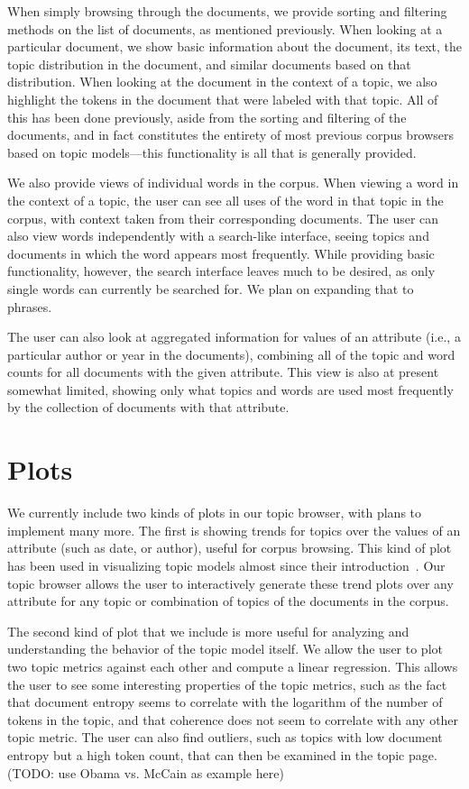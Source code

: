 \documentclass{article}
\begin{document}
When simply browsing through the documents, we provide sorting and filtering
methods on the list of documents, as mentioned previously.  When looking at a
particular document, we show basic information about the document, its text,
the topic distribution in the document, and similar documents based on that
distribution.  When looking at the document in the context of a topic, we also
highlight the tokens in the document that were labeled with that topic.  All of
this has been done previously, aside from the sorting and filtering of the
documents, and in fact constitutes the entirety of most previous corpus
browsers based on topic models---this functionality is all that is generally
provided.

We also provide views of individual words in the corpus.  When viewing a word
in the context of a topic, the user can see all uses of the word in that topic
in the corpus, with context taken from their corresponding documents.  The user
can also view words independently with a search-like interface, seeing topics
and documents in which the word appears most frequently.  While providing basic
functionality, however, the search interface leaves much to be desired, as only
single words can currently be searched for.  We plan on expanding that to
phrases.

The user can also look at aggregated information for values of an attribute
(i.e., a particular author or year in the documents), combining all of the
topic and word counts for all documents with the given attribute.  This view is
also at present somewhat limited, showing only what topics and words are used
most frequently by the collection of documents with that attribute.

\section{Plots}

We currently include two kinds of plots in our topic browser, with plans to
implement many more.  The first is showing trends for topics over the values of
an attribute (such as date, or author), useful for corpus browsing.  This kind
of plot has been used in visualizing topic models almost since their
introduction~\cite{griffiths-2004-finding-scientific-topics}.  Our topic
browser allows the user to interactively generate these trend plots over any
attribute for any topic or combination of topics of the documents in the
corpus.

The second kind of plot that we include is more useful for analyzing and
understanding the behavior of the topic model itself.  We allow the user to
plot two topic metrics against each other and compute a linear regression.
This allows the user to see some interesting properties of the topic metrics,
such as the fact that document entropy seems to correlate with the logarithm of
the number of tokens in the topic, and that coherence does not seem to
correlate with any other topic metric.  The user can also find outliers, such
as topics with low document entropy but a high token count, that can then be
examined in the topic page. (TODO: use Obama vs. McCain as example here)
\end{document}

